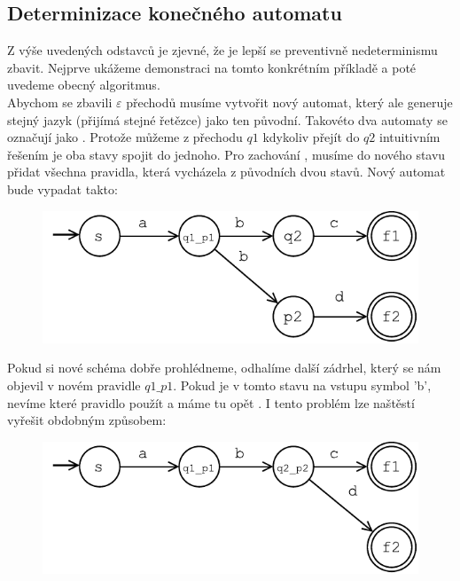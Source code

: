 \subsection*{Determinizace konečného automatu}

Z výše uvedených odstavců je zjevné, že je lepší se preventivně nedeterminismu
zbavit. Nejprve ukážeme demonstraci na tomto konkrétním příkladě a poté uvedeme
obecný algoritmus.\\

Abychom se zbavili $\varepsilon$ přechodů musíme vytvořit nový automat, který ale
generuje stejný jazyk (přijímá stejné řetězce)
jako ten původní. Takovéto dva automaty se označují jako .
Protože můžeme z přechodu $q1$ kdykoliv přejít do $q2$ intuitivním řešením
je oba stavy spojit do jednoho. Pro zachování , musíme
do nového stavu přidat všechna pravidla, která vycházela z původních dvou stavů.
Nový automat bude vypadat takto:

\begin{figure}[H]
  \centering
  \includegraphics{fig/finiteAutomat1_1.pdf}
\end{figure}

Pokud si nové schéma dobře prohlédneme, odhalíme další zádrhel, který se nám
objevil v novém pravidle $q1\_p1$. Pokud je v tomto stavu na vstupu symbol 'b',
nevíme které pravidlo použít a máme tu opět .
I tento problém lze naštěstí vyřešit obdobným způsobem:

\begin{figure}[H]
  \centering
  \includegraphics{fig/finiteAutomat1_2.pdf}
\end{figure}

